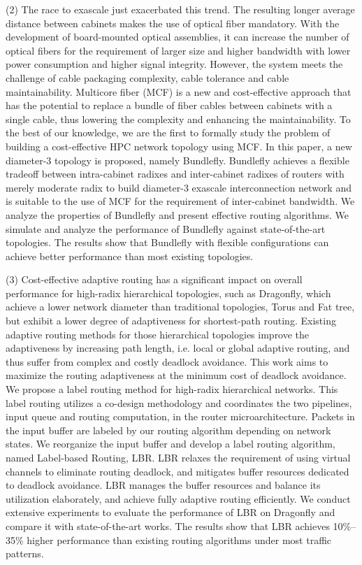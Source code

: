 \begin{eabstract}
  (2) The race to exascale just exacerbated this trend.
  The resulting longer average distance between cabinets
  makes the use of optical fiber mandatory.
  With the development of board-mounted optical assemblies,
  it can increase the number of optical fibers for the
  requirement of larger size and higher bandwidth with lower
  power consumption and higher signal integrity.
  However, the system meets the challenge of cable packaging complexity,
  cable tolerance and cable maintainability.
  Multicore fiber (MCF) is a new and cost-effective
  approach that has the potential to replace a bundle of fiber
  cables between cabinets with a single cable,
  thus lowering the complexity and enhancing the maintainability.
  To the best of our knowledge,
  we are the first to formally study the problem of building
  a cost-effective HPC network topology using MCF.
  In this paper, a new diameter-3 topology is proposed, namely Bundlefly.
  Bundlefly achieves a flexible tradeoff between intra-cabinet
  radixes and inter-cabinet radixes of routers
  with merely moderate radix to build diameter-3
  exascale interconnection network and is suitable to
  the use of MCF for the requirement of inter-cabinet bandwidth.
  We analyze the properties of Bundlefly and
  present effective routing algorithms.
  We simulate and analyze the performance of Bundlefly against
  state-of-the-art topologies.
  The results show that Bundlefly with flexible configurations
  can achieve better performance than most existing topologies.

  (3) Cost-effective adaptive routing has a significant
  impact on overall performance for high-radix hierarchical topologies,
  such as Dragonfly, which achieve a lower network diameter
  than traditional topologies, Torus and Fat tree,
  but exhibit a lower degree of adaptiveness for shortest-path routing.
  Existing adaptive routing methods for those hierarchical
  topologies improve the adaptiveness by increasing path length,
  i.e. local or global adaptive routing, and thus suffer from
  complex and costly deadlock avoidance.
  This work aims to maximize the routing adaptiveness at
  the minimum cost of deadlock avoidance.
  We propose a label routing method for high-radix hierarchical networks.
  This label routing utilizes a co-design methodology
  and coordinates the two pipelines,
  input queue and routing computation, in the router microarchitecture.
  Packets in the input buffer are labeled by our routing
  algorithm depending on network states.
  We reorganize the input buffer and develop a label routing algorithm,
  named Label-based Routing, LBR.
  LBR relaxes the requirement of using virtual channels
  to eliminate routing deadlock,
  and mitigates buffer resources dedicated to deadlock avoidance.
  LBR manages the buffer resources and balance its utilization elaborately,
  and achieve fully adaptive routing efficiently.
  We conduct extensive experiments to evaluate the performance
  of LBR on Dragonfly and compare it with state-of-the-art works.
  The results show that LBR achieves 10\%–35\% higher
  performance than existing routing algorithms under most
  traffic patterns.

\end{eabstract}

